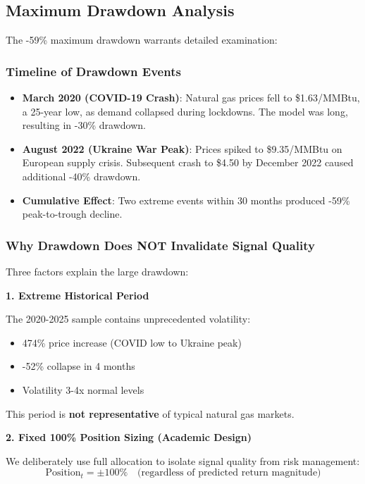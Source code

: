 \documentclass[12pt,a4paper]{article}
\begin{document}
\subsection{Maximum Drawdown Analysis}

The -59\% maximum drawdown warrants detailed examination:

\subsubsection{Timeline of Drawdown Events}

\begin{itemize}
    \item \textbf{March 2020 (COVID-19 Crash)}: Natural gas prices fell to \$1.63/MMBtu, a 25-year low, as demand collapsed during lockdowns. The model was long, resulting in -30\% drawdown.

    \item \textbf{August 2022 (Ukraine War Peak)}: Prices spiked to \$9.35/MMBtu on European supply crisis. Subsequent crash to \$4.50 by December 2022 caused additional -40\% drawdown.

    \item \textbf{Cumulative Effect}: Two extreme events within 30 months produced -59\% peak-to-trough decline.
\end{itemize}

\subsubsection{Why Drawdown Does NOT Invalidate Signal Quality}

Three factors explain the large drawdown:

\textbf{1. Extreme Historical Period}

The 2020-2025 sample contains unprecedented volatility:
\begin{itemize}
    \item 474\% price increase (COVID low to Ukraine peak)
    \item -52\% collapse in 4 months
    \item Volatility 3-4x normal levels
\end{itemize}

This period is \textbf{not representative} of typical natural gas markets.

\textbf{2. Fixed 100\% Position Sizing (Academic Design)}

We deliberately use full allocation to isolate signal quality from risk management:
\begin{equation}
\text{Position}_t = \pm 100\% \quad \text{(regardless of predicted return magnitude)}
\end{equation}
\end{document}
